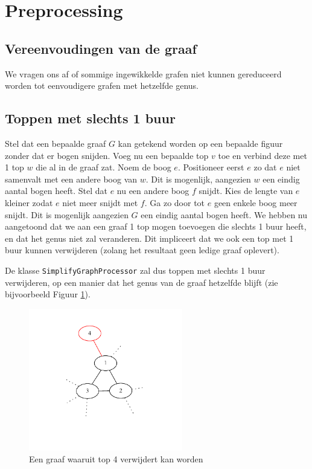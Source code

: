 \documentclass{article}
\begin{document}
\section{Preprocessing}
\label{preprocessing}

\subsection{Vereenvoudingen van de graaf}
We vragen ons af of sommige ingewikkelde grafen niet kunnen gereduceerd worden
tot eenvoudigere grafen met hetzelfde genus.

\subsection{Toppen met slechts 1 buur}
\label{one-neighbour}
Stel dat een bepaalde graaf $G$ kan getekend worden op een bepaalde figuur
zonder dat er bogen snijden. Voeg nu een bepaalde top $v$ toe en verbind deze
met 1 top $w$ die al in de graaf zat. Noem de boog $e$. Positioneer eerst $e$
zo dat $e$ niet samenvalt met een andere boog van $w$. Dit is mogenlijk,
aangezien $w$ een eindig aantal bogen heeft. Stel dat $e$ nu een andere boog
$f$ snijdt. Kies de lengte van $e$ kleiner zodat $e$ niet meer snijdt met $f$.
Ga zo door tot $e$ geen enkele boog meer snijdt. Dit is mogenlijk aangezien
$G$ een eindig aantal bogen heeft. We hebben nu aangetoond dat we aan een graaf
1 top mogen toevoegen die slechts 1 buur heeft, en dat het genus niet zal
veranderen. Dit impliceert dat we ook een top met 1 buur kunnen verwijderen
(zolang het resultaat geen ledige graaf oplevert).
\newline

De klasse \verb#SimplifyGraphProcessor# zal dus toppen met slechts 1 buur
verwijderen, op een manier dat het genus van de graaf hetzelfde blijft (zie
bijvoorbeeld Figuur \ref{fig:one-neighbour}).

\begin{figure}
\begin{center}
\includegraphics[width=0.6\textwidth]{images/one-neighbour.pdf}
\caption{Een graaf waaruit top 4 verwijdert kan worden}
\label{fig:one-neighbour}
\end{center}
\end{figure}
\end{document}
